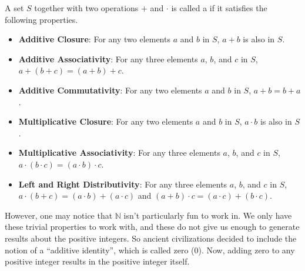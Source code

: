 \newpage

\begin{definition}
    A set $S$ together with two operations $+$ and $\cdot$ is called a  if it satisfies the following properties.
    \begin{itemize}
        \item \textbf{Additive Closure}: For any two elements $a$ and $b$ in $S$, $a + b$ is also in $S$.
        \item \textbf{Additive Associativity}: For any three elements $a$, $b$, and $c$ in $S$, $a+(b+c) = (a+b)+c$.
        \item \textbf{Additive Commutativity}: For any two elements $a$ and $b$ in $S$, $a + b = b + a$.
        \item \textbf{Multiplicative Closure}: For any two elements $a$ and $b$ in $S$, $a \cdot b$ is also in $S$.
        \item \textbf{Multiplicative Associativity}: For any three elements $a$, $b$, and $c$ in $S$, $a\cdot(b\cdot c) = (a\cdot b)\cdot c$.
        \item \textbf{Left and Right Distributivity}: For any three elements $a$, $b$, and $c$ in $S$, $a\cdot(b + c) = (a \cdot b) + (a \cdot c)$ and $(a + b) \cdot c = (a \cdot c) + (b \cdot c)$.
    \end{itemize}
\end{definition}

However, one may notice that $\mathbb{N}$ isn't particularly fun to work in. We only have these trivial properties to work with, and these do not give us enough to generate results about the positive integers. So ancient civilizations decided to include the notion of a ``additive identity'', which is called zero (0). Now, adding zero to any positive integer results in the positive integer itself.

